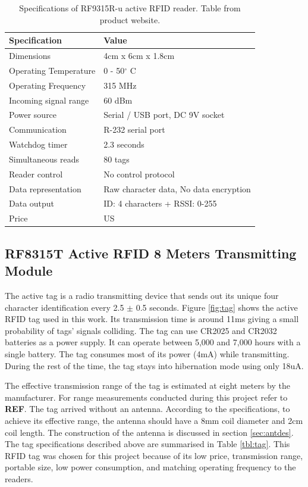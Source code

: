 \begin{table}[h]
	\centering
	\begin{tabular}{ | m{4cm} || m{7cm} | }
		\hline
		\textbf{Specification}	& \textbf{Value} \\ \hline
		Dimensions				& 4cm x 6cm x 1.8cm \\ \hline
		Operating Temperature	& 0 - 50$^\circ$ C	\\ \hline
		Operating Frequency		& 315 MHz	\\ \hline
		Incoming signal range	& 60 dBm \\ \hline
		Power source			& Serial / USB port, DC 9V socket \\ \hline
		Communication			& R-232 serial port \\ \hline
		Watchdog timer			& 2.3 seconds \\ \hline
		Simultaneous reads		& 80 tags	\\ \hline
		Reader control			& No control protocol \\ \hline
		Data representation		& Raw character data, No data encryption	\\ \hline
		Data output				& ID: 4 characters + RSSI: 0-255 \\ \hline
		Price					& US \textdollar 49.95 \\ \hline
	\end{tabular}
	\caption{Specifications of RF9315R-u active RFID reader. Table from product website\protect\footnotemark.}
	\label{tbl:reader}
\end{table}


\subsection{RF8315T Active RFID 8 Meters Transmitting Module}

The active tag is a radio transmitting device that sends out its unique four character identification every 2.5 $\pm$ 0.5 seconds. Figure \ref{fig:tag} shows the active RFID tag used in this work. Its transmission time is around 11ms giving a small probability of tags' signals colliding. The tag can use CR2025 and CR2032 batteries as a power supply. It can operate between 5,000 and 7,000 hours with a single battery. The tag consumes most of its power (4mA) while transmitting. During the rest of the time, the tag stays into hibernation mode using only 18uA.

The effective transmission range of the tag is estimated at eight meters by the manufacturer. For range measurements conducted during this project refer to \textbf{REF}. The tag arrived without an antenna. According to the specifications, to achieve its effective range, the antenna should have a 8mm coil diameter and 2cm coil length. The construction of the antenna is discussed in section \ref{sec:antdes}. The tag specifications described above are summarised in Table \ref{tbl:tag}. This RFID tag was chosen for this project because of its low price, transmission range, portable size, low power consumption, and matching operating frequency to the readers.

